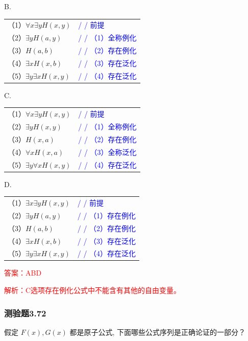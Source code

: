 \documentclass[UTF8, heading=true]{ctexart}
\begin{document}
B.

\begin{tabular}{ll}
  （1）$\forall x \exists y H(x, y)$ & \textcolor{blue}{/ / 前提} \\
  （2）$\exists y H(a, y)$ & \textcolor{blue}{/ / （1）全称例化} \\
  （3）$H(a, b)$ & \textcolor{blue}{/ / （2）存在例化} \\
  （4）$\exists x H(x, b)$ & \textcolor{blue}{/ / （3）存在泛化} \\
  （5）$\exists y \exists x H(x, y)$ & \textcolor{blue}{/ / （4）存在泛化}
\end{tabular}


C.

\begin{tabular}{ll}
  （1）$\forall x \exists y H(x, y)$ & \textcolor{blue}{/ / 前提} \\
  （2）$\exists y H(x, y)$ & \textcolor{blue}{/ / （1）全称例化} \\
  （3）$H(x, a)$ & \textcolor{blue}{/ / （2）存在例化} \\
  （4）$\forall x H(x, a)$ & \textcolor{blue}{/ / （3）全称泛化} \\
  （5）$\exists y \forall x H(x, y)$ & \textcolor{blue}{/ / （4）存在泛化}
\end{tabular}

D.

\begin{tabular}{ll}
  （1）$\exists x \exists y H(x, y)$ & \textcolor{blue}{/ / 前提} \\
  （2）$\exists y H(a, y)$ & \textcolor{blue}{/ / （1）存在例化} \\
  （3）$H(a, b)$ & \textcolor{blue}{/ / （2）存在例化} \\
  （4）$\exists x H(x, b)$ & \textcolor{blue}{/ / （3）存在泛化} \\
  （5）$\exists y \exists x H(x, y)$ & \textcolor{blue}{/ / （4）存在泛化}
\end{tabular}

\textcolor{red}{答案：ABD}

\textcolor{red}{解析：C选项存在例化公式中不能含有其他的自由变量。}

\subsubsection{测验题3.72}

假定 $F(x),G(x)$ 都是原子公式, 下面哪些公式序列是正确论证的一部分？
\end{document}
